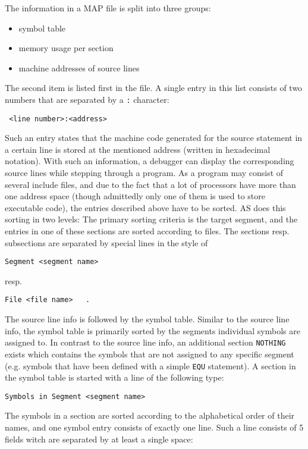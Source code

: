 \documentclass[12pt,twoside]{report}
\newcommand{\tty}[1]{{\tt #1}}
\begin{document}
The information in a MAP file is split into three groups:
\begin{itemize}
\item{symbol table}
\item{memory usage per section}
\item{machine addresses of source lines}
\end{itemize}
The second item is listed first in the file.  A single entry in this
list consists of two numbers that are separated by a \tty{:} character:
\begin{verbatim}
 <line number>:<address>
\end{verbatim}
Such an entry states that the machine code generated for the source
statement in a certain line is stored at the mentioned address
(written in hexadecimal notation).  With such an information, a
debugger can display the corresponding source lines while stepping
through a program.  As a program may consist of several include
files, and due to the fact that a lot of processors have more than
one address space (though admittedly only one of them is used to
store executable code), the entries described above have to be
sorted.  AS does this sorting in two levels: The primary sorting
criteria is the target segment, and the entries in one of these
sections are sorted according to files.  The sections resp.
subsections are separated by special lines in the style of
\begin{verbatim}
Segment <segment name>
\end{verbatim}
resp.
\begin{verbatim}
File <file name>   .
\end{verbatim}
The source line info is followed by the symbol table.  Similar to the
source line info, the symbol table is primarily sorted by the
segments individual symbols are assigned to.  In contrast to the
source line info, an additional section \tty{NOTHING} exists which contains
the symbols that are not assigned to any specific segment (e.g.
symbols that have been defined with a simple \tty{EQU} statement).  A
section in the symbol table is started with a line of the following
type:
\begin{verbatim}
Symbols in Segment <segment name>
\end{verbatim}
The symbols in a section are sorted according to the alphabetical
order of their names, and one symbol entry consists of exactly one
line.  Such a line consists of 5 fields witch are separated by at
least a single space:
\end{document}
